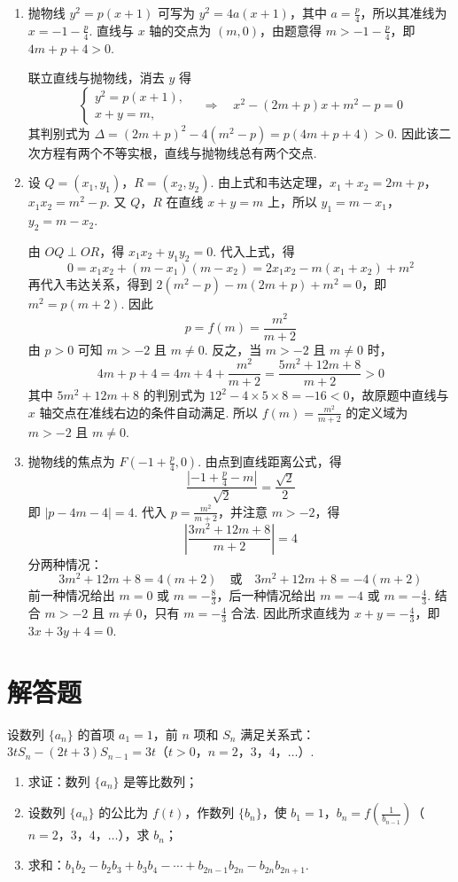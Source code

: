 \documentclass[UTF8,a4paper,oneside,11pt]{ctexbook}
\begin{document}
\begin{solution}
\begin{enumerate}
\item 抛物线 \(y^2=p(x+1)\) 可写为 \(y^2=4a(x+1)\)，其中 \(a=\frac p4\)，所以其准线为 \(x=-1-\frac p4\). 直线与 \(x\) 轴的交点为 \((m,0)\)，由题意得 \(m>-1-\frac p4\)，即 \(4m+p+4>0\).

联立直线与抛物线，消去 \(y\) 得
\[
\begin{cases}
y^2=p(x+1),\\
x+y=m,
\end{cases}
\quad\Longrightarrow\quad x^2-(2m+p)x+m^2-p=0
\]
其判别式为 \(\Delta=(2m+p)^2-4(m^2-p)=p(4m+p+4)>0\). 因此该二次方程有两个不等实根，直线与抛物线总有两个交点.
\item 设 \(Q=(x_1,y_1)\)，\(R=(x_2,y_2)\). 由上式和韦达定理，\(x_1+x_2=2m+p\)，\(x_1x_2=m^2-p\). 又 \(Q\)，\(R\) 在直线 \(x+y=m\) 上，所以 \(y_1=m-x_1\)，\(y_2=m-x_2\).

由 \(OQ\perp OR\)，得 \(x_1x_2+y_1y_2=0\). 代入上式，得
\[
0=x_1x_2+(m-x_1)(m-x_2)=2x_1x_2-m(x_1+x_2)+m^2
\]
再代入韦达关系，得到 \(2(m^2-p)-m(2m+p)+m^2=0\)，即 \(m^2=p(m+2)\). 因此
\[
p=f(m)=\frac{m^2}{m+2}
\]
由 \(p>0\) 可知 \(m>-2\) 且 \(m\neq0\). 反之，当 \(m>-2\) 且 \(m\neq0\) 时，
\[
4m+p+4=4m+4+\frac{m^2}{m+2}=\frac{5m^2+12m+8}{m+2}>0
\]
其中 \(5m^2+12m+8\) 的判别式为 \(12^2-4\times5\times8=-16<0\)，故原题中直线与 \(x\) 轴交点在准线右边的条件自动满足. 所以 \(f(m)=\frac{m^2}{m+2}\) 的定义域为 \(m>-2\) 且 \(m\neq0\).
\item 抛物线的焦点为 \(F\left(-1+\frac p4,0\right)\). 由点到直线距离公式，得
\[
\frac{\left|-1+\frac p4-m\right|}{\sqrt2}=\frac{\sqrt2}{2}
\]
即 \(|p-4m-4|=4\). 代入 \(p=\frac{m^2}{m+2}\)，并注意 \(m>-2\)，得
\[
\left|\frac{3m^2+12m+8}{m+2}\right|=4
\]
分两种情况：
\[
3m^2+12m+8=4(m+2)\quad\text{或}\quad3m^2+12m+8=-4(m+2)
\]
前一种情况给出 \(m=0\) 或 \(m=-\frac83\)，后一种情况给出 \(m=-4\) 或 \(m=-\frac43\). 结合 \(m>-2\) 且 \(m\neq0\)，只有 \(m=-\frac43\) 合法. 因此所求直线为 \(x+y=-\frac43\)，即 \(3x+3y+4=0\).
\end{enumerate}
\end{solution}

\section{解答题}

\begin{problem}
设数列 \(\{a_{n}\}\) 的首项 \(a_{1}=1\)，前 \(n\) 项和 \(S_{n}\) 满足关系式：\(3tS_{n}-(2t+3)S_{n-1}=3t\)（\(t>0\)，\(n=2\)，\(3\)，\(4\)，\(\dots\)）.

\begin{enumerate}
\item 求证：数列 \(\{a_{n}\}\) 是等比数列；
\item 设数列 \(\{a_{n}\}\) 的公比为 \(f(t)\)，作数列 \(\{b_{n}\}\)，使 \(b_{1}=1\)，\(b_{n}=f\left(\frac{1}{b_{n-1}}\right)\)（\(n=2\)，\(3\)，\(4\)，\(\dots\)），求 \(b_{n}\)；
\item 求和：\(b_{1}b_{2}-b_{2}b_{3}+b_{3}b_{4}-\cdots+b_{2n-1}b_{2n}-b_{2n}b_{2n+1}\).
\end{enumerate}
\end{problem}
\end{document}
